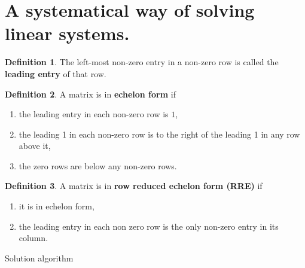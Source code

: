 \documentclass[11pt,a4paper]{article}
\theoremstyle{definition}
\newtheorem{definition}{Definition}
\begin{document}
\section{A systematical way of solving linear systems.}
\begin{definition}
    The left-most non-zero entry in a non-zero row is called the \textbf{leading entry} of that row.
\end{definition}

\begin{definition}
    A matrix is in \textbf{echelon form} if 
    \begin{enumerate}
        \item the leading entry in each non-zero row is $1$,
        \item the leading 1 in each non-zero row is to the right of the leading 1 in any row above it,
        \item the zero rows are below any non-zero rows. 
    \end{enumerate}
\end{definition}

\begin{definition}
    A matrix is in \textbf{row reduced echelon form (RRE)} if 
    \begin{enumerate}
        \item it is in echelon form,
        \item the leading entry in each non zero row is the only non-zero entry in its column.
    \end{enumerate}
\end{definition}
Solution algorithm
\end{document}
